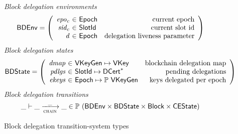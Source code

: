 \begin{figure}
  \emph{Block delegation environments}
  \begin{equation*}
    \BDEnv =
    \left(
      \begin{array}{r@{~\in~}lr}
        \var{epo_c} & \Epoch & \text{current epoch}\\
        \var{sid_c} & \SlotId & \text{current slot id}\\
        \var{d} & \Epoch & \text{delegation liveness parameter}\\
      \end{array}
    \right)
  \end{equation*}
  \emph{Block delegation states}
  \begin{equation*}
    \BDState =
    \left(
      \begin{array}{r@{~\in~}lr}
        \var{dmap} & \VKeyGen \mapsto \VKey & \text{blockchain delegation map}\\
        \var{pdlgs} & \SlotId \mapsto \seqof{\DCert} & \text{pending delegations}\\
        \var{ekeys} & \Epoch \mapsto \powerset{\VKeyGen} & \text{keys delegated per epoch}
      \end{array}
    \right)
  \end{equation*}
  \emph{Block delegation transitions}
  \begin{equation*}
    \_ \vdash \_ \trans{chain}{\_} \_ \in
      \powerset (\BDEnv \times \BDState \times \Block \times \CEState)
  \end{equation*}
  \caption{Block delegation transition-system types}
  \label{fig:ts-types:block-delegation}
\end{figure}

